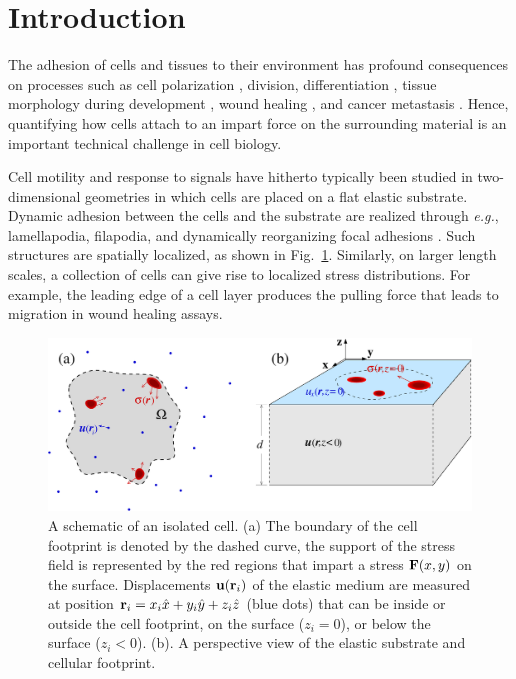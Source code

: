 \documentclass[aps,prl,reprint,twocolumn,groupedaddress,showpacs]{revtex4}
\def\r{{\bf r}}
\begin{document}
\section{Introduction}

The adhesion of cells and tissues to their environment has profound
consequences on processes such as cell polarization \cite{MASHA2011},
division, differentiation \cite{DIFFERENTIATION0}, tissue morphology
during development \cite{DEVELOPMENT0}, wound healing
\cite{WOUND0,WOUND2,WOUND1}, and cancer metastasis
\cite{CANCER0}. Hence, quantifying how cells attach to an impart force
on the surrounding material is an important technical challenge in
cell biology.

Cell motility and response to signals have hitherto typically been
studied in two-dimensional geometries in which cells are placed on a
flat elastic substrate.  Dynamic adhesion between the cells and the
substrate are realized through {\it e.g.}, lamellapodia, filapodia,
and dynamically reorganizing focal adhesions \cite{MBOC}.  Such structures are
spatially localized, as shown in Fig.~\ref{FIG1}. Similarly, on larger
length scales, a collection of cells can give rise to localized stress
distributions. For example, the leading edge of a cell layer produces
the pulling force that leads to migration in wound healing assays.

\begin{figure}[t]
\begin{center}
\includegraphics[width=\linewidth]{Fig1.pdf}
\caption{A schematic of an isolated cell. (a) The boundary of the cell
  footprint is denoted by the dashed curve, the support of the stress field is
  represented by the red regions that impart a stress ${\bf F}(x,y)$
  on the surface. Displacements ${\bf u}(\r_{i})$ of the elastic
  medium are measured at position $\r_{i} =
  x_{i}\hat{x}+y_{i}\hat{y}+z_{i}\hat{z}$ (blue dots) that can be
  inside or outside the cell footprint, on the surface ($z_{i}=0$), or
  below the surface ($z_{i}<0$). (b). A perspective view of the
  elastic substrate and cellular footprint.}
\label{FIG1}
\end{center}
\end{figure}
\end{document}
